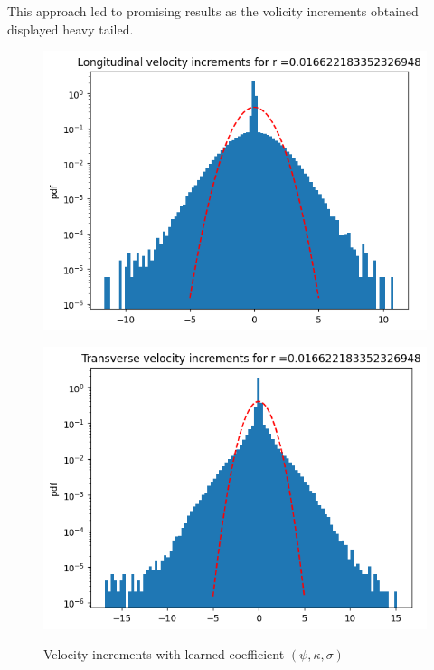 \documentclass[a4paper,12pt]{article}
\theoremstyle{definition}
\begin{document}
This approach led to promising results as the volicity increments obtained displayed heavy tailed.
\begin{figure}[H]
    \centering
    \begin{minipage}{0.48\textwidth}
        \centering
        \includegraphics[width=\linewidth]{VelIncrPSIKAPPASIGMA/VelIncrLong.png}
        \label{fig:VelIncrLong3}
    \end{minipage}\hfill
    \begin{minipage}{0.48\textwidth}
        \centering
        \includegraphics[width=\linewidth]{VelIncrPSIKAPPASIGMA/VelIncrTrans.png}
        \label{fig:VelIncrTrans3}
    \end{minipage}
    \caption{Velocity increments with learned coefficient \((\psi,\kappa,\sigma)\)}
\end{figure}
\end{document}
